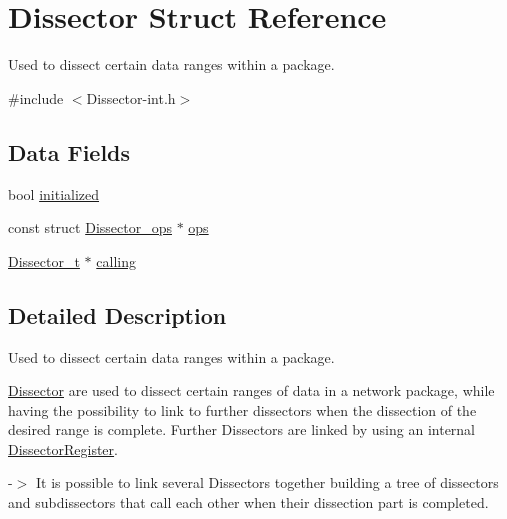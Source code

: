 \hypertarget{struct_dissector}{\section{Dissector Struct Reference}
\label{struct_dissector}
}


Used to dissect certain data ranges within a package.  




{\ttfamily \#include $<$Dissector-\/int.\-h$>$}

\subsection*{Data Fields}
\begin{DoxyCompactItemize}
\item 
bool \hyperlink{struct_dissector_a86386b01b6edc229f64d438929d92a4f}{initialized}
\item 
const struct \hyperlink{struct_dissector__ops}{Dissector\-\_\-ops} $\ast$ \hyperlink{struct_dissector_a2786b3015a49f746ecbbc33840838a4e}{ops}
\item 
\hyperlink{struct_dissector}{Dissector\-\_\-t} $\ast$ \hyperlink{struct_dissector_a9c793579ef8c1fa11c26a0d146bc2f2c}{calling}
\end{DoxyCompactItemize}


\subsection{Detailed Description}
Used to dissect certain data ranges within a package. 

\hyperlink{struct_dissector}{Dissector} are used to dissect certain ranges of data in a network package, while having the possibility to link to further dissectors when the dissection of the desired range is complete. Further Dissectors are linked by using an internal \hyperlink{struct_dissector_register}{Dissector\-Register}.

-\/$>$ It is possible to link several Dissectors together building a tree of dissectors and subdissectors that call each other when their dissection part is completed. 

